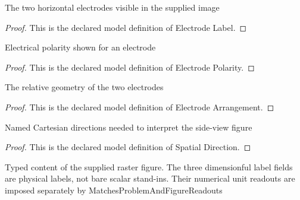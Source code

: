\begin{definition}
  \label{def:physics:phyx-mini-0639:phyxminiproblems-problemphyxmini0639-electrodelabel}
  The two horizontal electrodes visible in the supplied image
\end{definition}
\begin{proof}
  This is the declared model definition of Electrode Label.
\end{proof}
\begin{definition}
  \label{def:physics:phyx-mini-0639:phyxminiproblems-problemphyxmini0639-electrodepolarity}
  Electrical polarity shown for an electrode
\end{definition}
\begin{proof}
  This is the declared model definition of Electrode Polarity.
\end{proof}
\begin{definition}
  \label{def:physics:phyx-mini-0639:phyxminiproblems-problemphyxmini0639-electrodearrangement}
  The relative geometry of the two electrodes
\end{definition}
\begin{proof}
  This is the declared model definition of Electrode Arrangement.
\end{proof}
\begin{definition}
  \label{def:physics:phyx-mini-0639:phyxminiproblems-problemphyxmini0639-spatialdirection}
  Named Cartesian directions needed to interpret the side-view figure
\end{definition}
\begin{proof}
  This is the declared model definition of Spatial Direction.
\end{proof}
\begin{definition}
  \label{def:physics:phyx-mini-0639:phyxminiproblems-problemphyxmini0639-parallelelectrodefigure}
  Typed content of the supplied raster figure. The three dimensionful label fields are physical labels, not bare scalar stand-ins. Their numerical unit readouts are imposed separately by MatchesProblemAndFigureReadouts
\end{definition}
